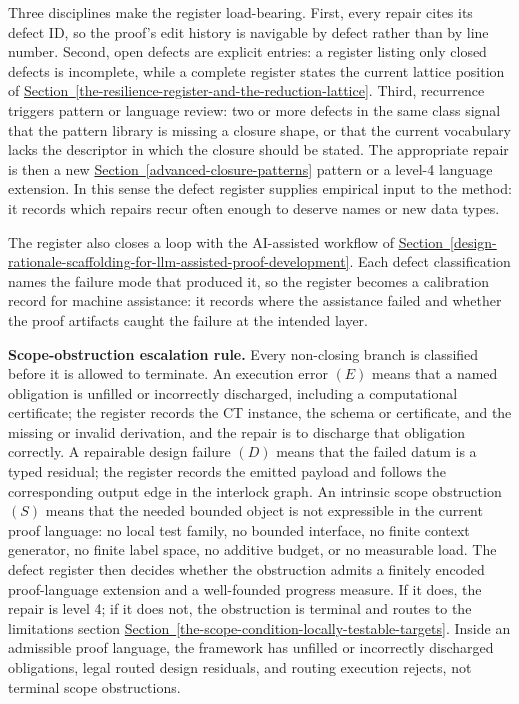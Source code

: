 \documentclass[
  11pt,
]{article}
\theoremstyle{definition}
\newcommand{\secref}[1]{\hyperref[#1]{Section~\ref*{#1}}}
\begin{document}
Three disciplines make the register load-bearing. First, every repair
cites its defect ID, so the proof's edit history is navigable by defect
rather than by line number. Second, open defects are explicit entries: a
register listing only closed defects is incomplete, while a complete
register states the current lattice position of \secref{the-resilience-register-and-the-reduction-lattice}. Third,
recurrence triggers pattern or language review: two or more defects in
the same class signal that the pattern library is missing a closure
shape, or that the current vocabulary lacks the descriptor in which the
closure should be stated. The appropriate repair is then a new
\secref{advanced-closure-patterns} pattern or a level-4 language extension. In this
sense the defect register supplies empirical input to the method: it
records which repairs recur often enough to deserve names or new data
types.

The register also closes a loop with the AI-assisted workflow of \secref{design-rationale-scaffolding-for-llm-assisted-proof-development}. Each
defect classification names the failure mode that produced it, so the
register becomes a calibration record for machine assistance: it records
where the assistance failed and whether the proof artifacts caught the
failure at the intended layer.

\textbf{Scope-obstruction escalation rule.} Every non-closing branch is
classified before it is allowed to terminate. An execution error \((E)\)
means that a named obligation is unfilled or incorrectly discharged,
including a computational certificate; the register records the CT
instance, the schema or certificate, and the missing or invalid
derivation, and the repair is to discharge that obligation correctly. A
repairable design failure
\((D)\) means that the failed datum is a typed residual; the register
records the emitted payload and follows the corresponding output edge in
the interlock graph. An intrinsic scope obstruction \((S)\) means that
the needed bounded object is not expressible in the current proof
language: no local test family, no bounded interface, no finite context
generator, no finite label space, no additive budget, or no measurable
load. The defect register then decides whether the obstruction admits a
  finitely encoded proof-language extension and a well-founded progress
  measure. If it does, the repair is level 4; if it does not, the obstruction is
terminal and routes to the limitations section
\secref{the-scope-condition-locally-testable-targets}. Inside an
admissible proof language, the framework has unfilled or incorrectly
discharged obligations, legal routed design residuals, and routing
execution rejects, not terminal scope obstructions.
\end{document}
